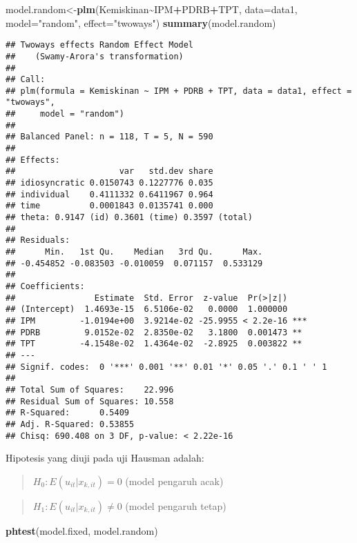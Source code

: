 \documentclass[
]{book}
\newenvironment{Shaded}{\begin{snugshade}}{\end{snugshade}}
\newcommand{\DataTypeTok}[1]{\textcolor[rgb]{0.13,0.29,0.53}{#1}}
\newcommand{\KeywordTok}[1]{\textcolor[rgb]{0.13,0.29,0.53}{\textbf{#1}}}
\newcommand{\NormalTok}[1]{#1}
\newcommand{\OperatorTok}[1]{\textcolor[rgb]{0.81,0.36,0.00}{\textbf{#1}}}
\newcommand{\StringTok}[1]{\textcolor[rgb]{0.31,0.60,0.02}{#1}}
\begin{document}
\begin{Shaded}
\begin{Highlighting}[]
\NormalTok{model.random\textless{}{-}}\KeywordTok{plm}\NormalTok{(Kemiskinan}\OperatorTok{\textasciitilde{}}\NormalTok{IPM}\OperatorTok{+}\NormalTok{PDRB}\OperatorTok{+}\NormalTok{TPT, }\DataTypeTok{data=}\NormalTok{data1, }\DataTypeTok{model=}\StringTok{"random"}\NormalTok{, }\DataTypeTok{effect=}\StringTok{"twoways"}\NormalTok{)}
\KeywordTok{summary}\NormalTok{(model.random)}
\end{Highlighting}
\end{Shaded}

\begin{verbatim}
## Twoways effects Random Effect Model 
##    (Swamy-Arora's transformation)
## 
## Call:
## plm(formula = Kemiskinan ~ IPM + PDRB + TPT, data = data1, effect = "twoways", 
##     model = "random")
## 
## Balanced Panel: n = 118, T = 5, N = 590
## 
## Effects:
##                     var   std.dev share
## idiosyncratic 0.0150743 0.1227776 0.035
## individual    0.4111332 0.6411967 0.964
## time          0.0001843 0.0135741 0.000
## theta: 0.9147 (id) 0.3601 (time) 0.3597 (total)
## 
## Residuals:
##      Min.   1st Qu.    Median   3rd Qu.      Max. 
## -0.454852 -0.083503 -0.010059  0.071157  0.533129 
## 
## Coefficients:
##                Estimate  Std. Error  z-value  Pr(>|z|)    
## (Intercept)  1.4693e-15  6.5106e-02   0.0000  1.000000    
## IPM         -1.0194e+00  3.9214e-02 -25.9955 < 2.2e-16 ***
## PDRB         9.0152e-02  2.8350e-02   3.1800  0.001473 ** 
## TPT         -4.1548e-02  1.4364e-02  -2.8925  0.003822 ** 
## ---
## Signif. codes:  0 '***' 0.001 '**' 0.01 '*' 0.05 '.' 0.1 ' ' 1
## 
## Total Sum of Squares:    22.996
## Residual Sum of Squares: 10.558
## R-Squared:      0.5409
## Adj. R-Squared: 0.53855
## Chisq: 690.408 on 3 DF, p-value: < 2.22e-16
\end{verbatim}

Hipotesis yang diuji pada uji Hausman adalah:

\begin{quote}
\(H_0: E(u_{it}|x_{k, it})=0\) (model pengaruh acak)
\end{quote}

\begin{quote}
\(H_1: E(u_{it}|x_{k, it}) \ne 0\) (model pengaruh tetap)
\end{quote}

\begin{Shaded}
\begin{Highlighting}[]
\KeywordTok{phtest}\NormalTok{(model.fixed, model.random)}
\end{Highlighting}
\end{Shaded}
\end{document}
